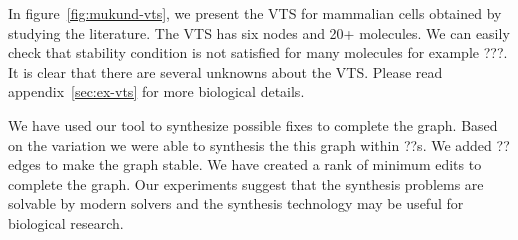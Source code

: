 
  
In figure~\ref{fig:mukund-vts}, we present the VTS for mammalian cells
obtained by studying the literature.
%
The VTS has six nodes and 20+ molecules.
%
We can easily check that stability condition is not satisfied for
many molecules for example ???.
%
It is clear that there are several unknowns about the VTS.
%
Please read appendix~\ref{sec:ex-vts} for more biological details.


We have used our tool to synthesize possible fixes to complete the
graph.
%
Based on the variation we were able to synthesis the this graph
within ??s.
%
We added ?? edges to make the graph stable.
%
We have created a rank of minimum edits to complete the
graph.
%
Our experiments suggest that the synthesis problems are
solvable by modern solvers and the synthesis technology may be useful
for biological research.

